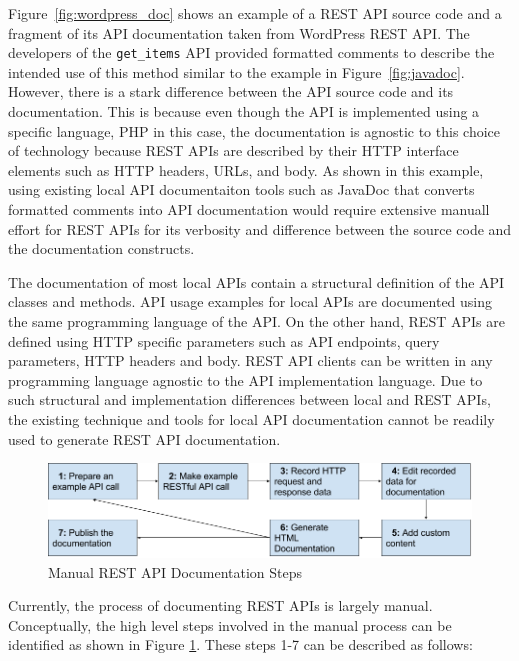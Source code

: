 Figure~\ref{fig:wordpress_doc} shows an example of a REST API source code and a fragment of its API documentation
taken from WordPress REST API. The developers of the \texttt{get\_items} API provided formatted comments to describe the intended use of this method similar to the example
in Figure~\ref{fig:javadoc}. However, there is a stark difference between the API source code and its documentation. This is because even though the API is implemented
using a specific language, PHP in this case, the documentation is agnostic to this choice of technology because REST APIs are described by their HTTP interface elements such as
HTTP headers, URLs, and body. As shown in this example, using existing local API documentaiton tools such as JavaDoc that converts formatted comments into API documentation would require extensive
manuall effort for REST APIs for its verbosity and difference between the source code and the documentation constructs.

The documentation of most local APIs
contain a structural definition of the API classes and methods. API usage examples for local APIs are documented using the same programming language of the API. On the other hand, REST APIs
are defined using HTTP specific parameters such as API endpoints, query parameters, HTTP headers and body. REST API clients can be written in any programming language agnostic to the API
implementation language. Due to such structural and implementation differences between local and REST APIs, the existing technique and tools for local API documentation cannot be readily
used to generate REST API documentation.


\begin{figure}[htb]
  \includegraphics[width=\linewidth]{manual_workflow.png}
  \caption{Manual REST API Documentation Steps}
  \label{fig:manual}
\end{figure}

Currently, the process of documenting REST APIs is largely manual. Conceptually, the high level steps involved in the manual process can be identified as shown in Figure \ref{fig:manual}. These steps 1-7 can be described as follows:

